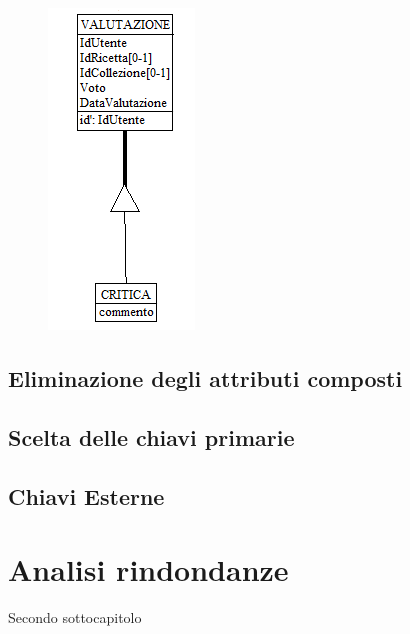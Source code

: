 ﻿\documentclass[a4paper,12pt]{report}
\begin{document}
\begin{figure}[h!]
    \centering
    \includegraphics[width=0.3\linewidth]{app_images/gerarchia_valutazione.png}
\end{figure}
\subsection{Eliminazione degli attributi composti}
\subsection{Scelta delle chiavi primarie}
\subsection{Chiavi Esterne}
\section{Analisi rindondanze}
Secondo sottocapitolo
\end{document}
